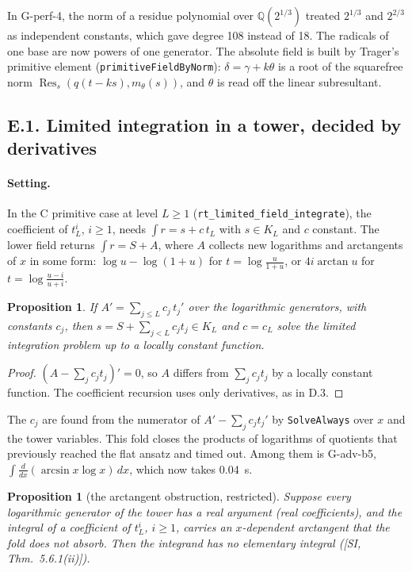 \documentclass[11pt]{article}
\newtheorem{proposition}[theorem]{Proposition}
\theoremstyle{definition}
\theoremstyle{remark}
\newcommand{\Q}{\mathbb{Q}}
\newcommand{\code}[1]{\texttt{#1}}
\begin{document}
In G-perf-4, the norm of a residue polynomial over $\Q(2^{1/3})$ treated
$2^{1/3}$ and $2^{2/3}$ as independent constants, which gave degree 108
instead of 18. The radicals of one base are now powers of one generator. The
absolute field is built by Trager's primitive element
(\code{primitiveFieldByNorm}): $\delta=\gamma+k\theta$ is a root of the
squarefree norm $\operatorname{Res}_s(q(t-ks),m_\theta(s))$, and $\theta$ is
read off the linear subresultant.

\subsection*{E.1. Limited integration in a tower, decided by derivatives}

\paragraph{Setting.} In the C primitive case at level $L\ge1$
(\code{rt\_limited\_field\_integrate}), the coefficient of $t_L^i$, $i\ge1$,
needs $\int r=s+c\,t_L$ with $s\in K_L$ and $c$ constant. The lower field
returns $\int r=S+A$, where $A$ collects new logarithms and arctangents of
$x$ in some form: $\log u-\log(1+u)$ for $t=\log\frac u{1+u}$, or
$4i\arctan u$ for $t=\log\frac{u-i}{u+i}$.

\begin{proposition}\label{prop:E1fold}
If $A'=\sum_{j\le L}c_j\,t_j'$ over the logarithmic generators, with constants
$c_j$, then $s=S+\sum_{j<L}c_jt_j\in K_L$ and $c=c_L$ solve the limited
integration problem up to a locally constant function.
\end{proposition}

\begin{proof}
$(A-\sum_jc_jt_j)'=0$, so $A$ differs from $\sum_jc_jt_j$ by a locally
constant function. The coefficient recursion uses only derivatives, as in
D.3.
\end{proof}

The $c_j$ are found from the numerator of $A'-\sum_jc_jt_j'$ by
\code{SolveAlways} over $x$ and the tower variables. This fold closes the
products of logarithms of quotients that previously reached the flat ansatz
and timed out. Among them is G-adv-b5,
$\int\frac{d}{dx}(\arcsin x\log x)\,dx$, which now takes 0.04~s.

\begin{proposition}[the arctangent obstruction, restricted]\label{prop:E1arctan}
Suppose every logarithmic generator of the tower has a real argument (real
coefficients), and the integral of a coefficient of $t_L^i$, $i\ge1$,
carries an $x$-dependent arctangent that the fold does not absorb. Then the
integrand has no elementary integral ([SI, Thm.~5.6.1(ii)]).
\end{proposition}
\end{document}
